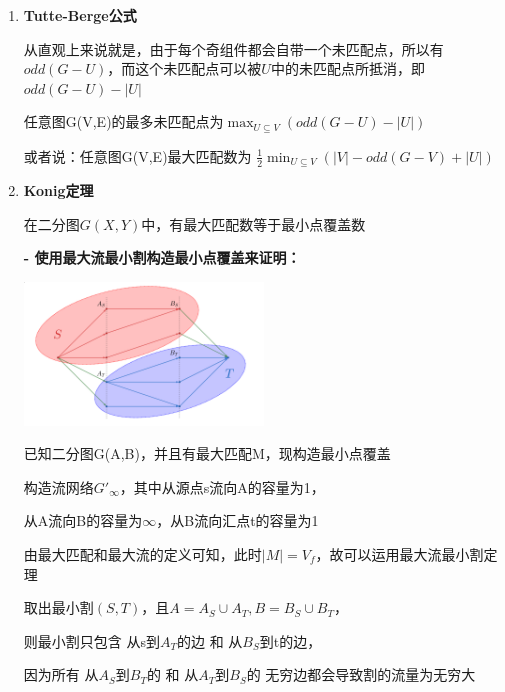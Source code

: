 \documentclass[UTF8]{ctexart}
\begin{document}
\begin{enumerate}
            \vspace{1cm}

      \item

            \textbf{Tutte-Berge公式}\cite{berge1958couplage}

            从直观上来说就是，由于每个奇组件都会自带一个未匹配点，所以有$odd(G-U)$，而这个未匹配点可以被$U$中的未匹配点所抵消，即$odd(G-U)-|U|$

            任意图G(V,E)的最多未匹配点为$\max_{U\subseteq V}(odd(G-U)-|U|)$

            或者说：任意图G(V,E)最大匹配数为 $\frac{1}{2}\min_{U\subseteq V}(|V|-odd(G-V)+|U|)$


            \vspace{3cm}


      \item

            \textbf{Konig定理}\cite{kHonig1931grafok}

            在二分图$G(X,Y)$中，有最大匹配数等于最小点覆盖数


            \vspace{0.5cm}


            \textbf{- 使用最大流最小割构造最小点覆盖来证明：}

            \includegraphics[width=0.5\textwidth]{img/Minimum_cut_in_a_bipartite_graph.png}

            已知二分图G(A,B)，并且有最大匹配M，现构造最小点覆盖

            构造流网络$G'_\infty$，其中从源点s流向A的容量为1，

            从A流向B的容量为$\infty$，从B流向汇点t的容量为1

            由最大匹配和最大流的定义可知，此时$|M|=V_f$，故可以运用最大流最小割定理

            取出最小割$(S,T)$，且$A=A_S\cup A_T,B=B_S\cup B_T$，

            则最小割只包含 从s到$A_T$的边 和 从$B_S$到t的边，

            因为所有 从$A_S$到$B_T$的 和 从$A_T$到$B_S$的 无穷边都会导致割的流量为无穷大


\end{enumerate}
\end{document}
